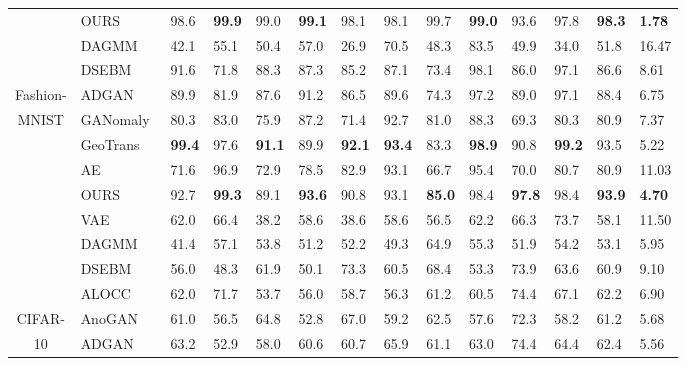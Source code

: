 \documentclass[journal]{IEEEtran}
\begin{document}
\begin{table*}[!htb]
\begin{minipage}[t]{0.95\textwidth}
\begin{tabular}{cx{2.0cm}x{0.6cm}x{0.6cm}x{0.6cm}x{0.6cm}x{0.6cm}x{0.6cm}x{0.6cm}x{0.6cm}x{0.6cm}x{0.6cm}x{0.6cm}x{0.8cm}}
		& OURS & 98.6 & \textbf{99.9} & 99.0 & \textbf{99.1} & 98.1 & 98.1 & 99.7 & \textbf{99.0} & 93.6 & 97.8 & \textbf{98.3} & \textbf{1.78}\\
		        \cmidrule(lr){1-14}
		& DAGMM~\cite{zhai2016deep} 
        & 42.1 & 55.1 & 50.4 & 57.0 & 26.9 & 70.5 & 48.3 & 83.5 & 49.9 & 34.0 & 51.8 & 16.47\\
		& DSEBM~\cite{zong2018deep} 
		& 91.6 & 71.8 & 88.3 & 87.3 & 85.2 & 87.1 & 73.4 & 98.1 & 86.0 & 97.1 & 86.6 & 8.61\\
		Fashion- & ADGAN~\cite{deecke2018image} 
		& 89.9 & 81.9 & 87.6 & 91.2 & 86.5 & 89.6 & 74.3 & 97.2 & 89.0 & 97.1 & 88.4 & 6.75\\
		MNIST & GANomaly~\cite{Akcay2018} 
		& 80.3 & 83.0 & 75.9 & 87.2 & 71.4 & 92.7 & 81.0 & 88.3 & 69.3 & 80.3 & 80.9 & 7.37\\
		& GeoTrans~\cite{golan2018deep} 
		& \textbf{99.4} & 97.6 & \textbf{91.1} & 89.9 & \textbf{92.1} & \textbf{93.4} & 83.3 & \textbf{98.9} & 90.8 & \textbf{99.2} & 93.5 & 5.22\\
		\cmidrule(lr){2-2} \cmidrule(lr){3-3} \cmidrule(lr){4-4} \cmidrule(lr){5-5} \cmidrule(lr){6-6} \cmidrule(lr){7-7} \cmidrule(lr){8-8} \cmidrule(lr){9-9} \cmidrule(lr){10-10} \cmidrule(lr){11-11} \cmidrule(lr){12-12} \cmidrule(lr){13-13} \cmidrule(lr){14-14}
		& AE & 71.6 & 96.9 & 72.9 & 78.5 & 82.9 & 93.1 & 66.7 & 95.4 & 70.0 & 80.7 & 80.9 & 11.03\\
		& OURS & 92.7 & \textbf{99.3} & 89.1 & \textbf{93.6} & 90.8 & 93.1 & \textbf{85.0} & 98.4 & \textbf{97.8} & 98.4 & \textbf{93.9} & \textbf{4.70}\\
        \cmidrule(lr){1-14}
	& VAE~\cite{kingma2013auto} 
	& 62.0 & 66.4 & 38.2 & 58.6 & 38.6 & 58.6 & 56.5 & 62.2 & 66.3 & 73.7 & 58.1 & 11.50\\
	& DAGMM~\cite{zhai2016deep} 
	& 41.4 & 57.1 & 53.8 & 51.2 & 52.2 & 49.3 & 64.9 & 55.3 & 51.9 & 54.2 & 53.1 & 5.95\\
	& DSEBM~\cite{zong2018deep} 
	& 56.0 & 48.3 & 61.9 & 50.1 & 73.3 & 60.5 & 68.4 & 53.3 & 73.9 & 63.6 & 60.9 & 9.10\\
	& ALOCC~\cite{Sabokrou2018Adversarially}
	& 62.0 & 71.7 & 53.7 & 56.0 & 58.7 & 56.3 & 61.2 & 60.5 & 74.4 & 67.1 & 62.2 & 6.90\\
	CIFAR- & AnoGAN~\cite{schlegl2017unsupervised} 
	& 61.0 & 56.5 & 64.8 & 52.8 & 67.0 & 59.2 & 62.5 & 57.6 & 72.3 & 58.2 & 61.2 & 5.68\\
	10& ADGAN~\cite{deecke2018image} 
	& 63.2 & 52.9 & 58.0 & 60.6 & 60.7 & 65.9 & 61.1 & 63.0 & 74.4 & 64.4 & 62.4 & 5.56\\

\end{tabular}
\end{minipage}
\end{table*}
\end{document}
